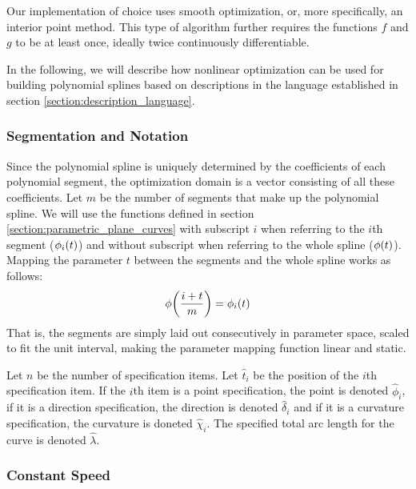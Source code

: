 \documentclass[a4paper]{article}
\begin{document}
				Our implementation of choice uses smooth optimization, or, more specifically, an interior point method. This type of algorithm further requires the functions \(f\) and \(g\) to be at least once, ideally twice continuously differentiable.

				In the following, we will describe how nonlinear optimization can be used for building polynomial splines based on descriptions in the language established in section \ref{section:description_language}.

			\subsubsection{Segmentation and Notation}
			\label{section:segmentation_notation}

				Since the polynomial spline is uniquely determined by the coefficients of each polynomial segment, the optimization domain is a vector consisting of all these coefficients. Let \(m\) be the number of segments that make up the polynomial spline. We will use the functions defined in section \ref{section:parametric_plane_curves} with subscript \(i\) when referring to the \(i\)th segment (\(\phi_i\!\left( t \right)\)) and without subscript when referring to the whole spline (\(\phi\!\left( t \right)\)). Mapping the parameter \(t\) between the segments and the whole spline works as follows:
				\begin{equation*}
					\phi\!\left( \frac{i + t}{m} \right) = \phi_i\!\left( t \right)
				\end{equation*}
				That is, the segments are simply laid out consecutively in parameter space, scaled to fit the unit interval, making the parameter mapping function linear and static.

				Let \(n\) be the number of specification items. Let \(\hat{t}_i\) be the position of the \(i\)th specification item. If the \(i\)th item is a point specification, the point is denoted \(\hat{\phi}_i\), if it is a direction specification, the direction is denoted \(\hat{\delta}_i\) and if it is a curvature specification, the curvature is doneted \(\hat{\chi}_i\). The specified total arc length for the curve is denoted \(\hat{\lambda}\).

			\subsubsection{Constant Speed}
			\label{section:constant_speed}
\end{document}
